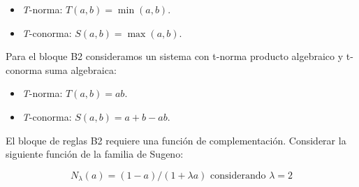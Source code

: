 \documentclass[11pt, a4paper]{article}
\begin{document}
	\begin{itemize}
		\item \textit{T}-norma: $T(a,b) = \min(a,b)$.
		\item \textit{T}-conorma: $S(a,b) = \max(a,b)$.
	\end{itemize}

	Para el bloque B2 consideramos un sistema con t-norma producto algebraico y t-conorma suma algebraica:

	\begin{itemize}
		\item \textit{T}-norma: $T(a,b) = ab$.
		\item \textit{T}-conorma: $S(a,b) = a + b - ab$.
	\end{itemize}

	El bloque de reglas B2 requiere una función de complementación. Considerar la siguiente función de la familia de Sugeno:

	$$N_{\lambda}(a)= (1-a) / (1 + \lambda a) \text{ considerando } \lambda = 2$$
\end{document}
